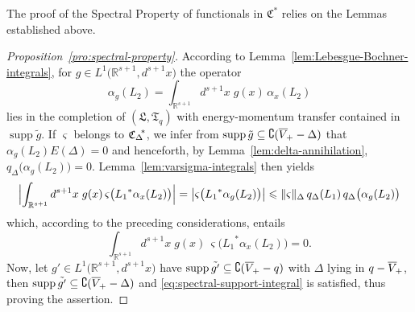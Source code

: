 \documentclass[a4paper,a4paper]{article}
\numberwithin{equation}{section}
\newcommand{\Lfrak}{\mathfrak{L}}
\newcommand{\Tfrak}{\mathfrak{T}}
\newcommand{\Rsone}{\mathbb{R}^{s + 1}}
\newcommand{\fwcone}{\overline{V}_{\negthinspace +}}
\newcommand{\ED}{E ( \Delta )}
\newcommand{\Cstar}{\mathfrak{C}^*}
\newcommand{\CDstar}{{\mathfrak{C}_\Delta}^{\negthickspace *}}
\newcommand{\ax}{\alpha_x}
\theoremstyle{definition}
\theoremstyle{plain}
\theoremstyle{remark}
\DeclareMathOperator{\supp}{supp}
\newcommand{\babs}[1]{\bigl\lvert #1 \bigr\rvert}
\newcommand{\Babs}[1]{\Bigl\lvert #1 \Bigr\rvert}
\newcommand{\norm}[1]{\lVert #1 \rVert}
\newcommand{\qDx}[1]{q_\Delta ( #1 )}
\newcommand{\bqDx}[1]{q_\Delta \bigl( #1 \bigr)}
\begin{document}
  The proof of the Spectral Property of functionals in $\Cstar$ relies
  on the Lemmas established above.
  \begin{proof}[Proposition~\ref{pro:spectral-property}]
    According to Lemma~\ref{lem:Lebesgue-Bochner-integrals}, for $g
    \in L^1 \bigl( \Rsone , d^{s + 1} x \bigr)$ the operator
    \begin{equation*}
      \alpha_g ( L_2 ) = \int_{\Rsone} d^{s + 1} x \; g ( x ) \,
      \ax ( L_2 )
    \end{equation*}
    lies in the completion of $( \Lfrak , \Tfrak_q )$ with
    energy-momentum transfer contained in $\supp \tilde{g}$. If
    $\varsigma$ belongs to $\CDstar$, we infer from $\supp \tilde{g}
    \subseteq \complement ( \fwcone - \Delta )$ that $\alpha_g ( L_2 )
    \ED = 0$ and henceforth, by Lemma~\ref{lem:delta-annihilation},
    $\bqDx{\alpha_g ( L_2 )} = 0$. Lemma~\ref{lem:varsigma-integrals}
    then yields
    \begin{equation*}
      \Babs{\int_{\Rsone} d^{s + 1} x \; g ( x ) \, \varsigma \bigl(
      {L_1}^* \ax ( L_2 ) \bigr)} =  \babs{\varsigma \bigl( {L_1}^*
      \alpha_g ( L_2 ) \bigr)} \leqslant \norm{\varsigma}_\Delta \,
      \qDx{L_1} \, \bqDx{\alpha_g ( L_2 )}
    \end{equation*}
    which, according to the preceding considerations, entails
    \begin{equation}
      \label{eq:spectral-support-integral}
      \int_{\Rsone} d^{s + 1} x \; g ( x ) \, \varsigma \bigl( {L_1}^*
      \ax ( L_2 ) \bigr) = 0 \text{.}
    \end{equation}
    Now, let $g' \in L^1 \bigl( \Rsone , d^{s + 1} x \bigr)$ have
    $\supp \tilde{g'} \subseteq \complement ( \fwcone - q )$ with
    $\Delta$ lying in $q -\fwcone$, then $\supp \tilde{g'} \subseteq
    \complement ( \fwcone - \Delta )$ and
    \eqref{eq:spectral-support-integral} is satisfied, thus proving
    the assertion.
  \end{proof}
  
\end{document}
